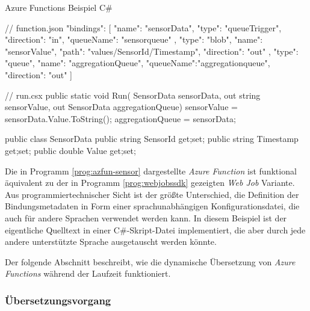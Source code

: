 \begin{program}[!hbt]
\caption{Azure Functions Beispiel C\#}
\label{prog:azfun-sensor}
\noindent\begin{minipage}[t]{.49\textwidth}
\lstset{xleftmargin=0.0cm,framexleftmargin=0.0cm}
\begin{CsCode}[numbers=none]
// function.json
{
  "bindings": [
    { "name": "sensorData",
      "type": "queueTrigger",
      "direction": "in",
      "queueName": "sensorqueue" 
		},
    { "type": "blob",
      "name": "sensorValue",
      "path": "values/{SensorId}/{Timestamp}",
      "direction": "out"
    },
    { "type": "queue",
      "name": "aggregationQueue",
      "queueName":"aggregationqueue",
      "direction": "out"
    }
  ]
}
\end{CsCode}
\end{minipage}\hfill
\begin{minipage}[t]{.48\textwidth}
\lstset{showlines=true,xleftmargin=0.0cm,framexleftmargin=0.0cm}
\begin{CsCode}[numbers=none]
// run.csx
public static void Run(
  SensorData sensorData, 
  out string sensorValue, 
  out SensorData aggregationQueue) {
    sensorValue = 
      sensorData.Value.ToString();
    aggregationQueue = sensorData;
}

public class SensorData {
  public string SensorId {get;set;}
  public string Timestamp {get;set;}
  public double Value {get;set;}
}






\end{CsCode} %
\end{minipage}
\end{program}

Die in Programm \ref{prog:azfun-sensor} dargestellte \textit{Azure Function} ist funktional äquivalent zu der in Programm \ref{prog:webjobssdk} gezeigten \textit{Web Job} Variante. Aus programmiertechnischer Sicht ist der größte Unterschied, die Definition der Bindungsmetadaten in Form einer sprachunabhängigen Konfigurationsdatei, die auch für andere Sprachen verwendet werden kann. In diesem Beispiel ist der eigentliche Quelltext in einer C\#-Skript-Datei implementiert, die aber durch jede andere unterstützte Sprache ausgetauscht werden könnte.

Der folgende Abschnitt beschreibt, wie die dynamische Übersetzung von \textit{Azure Functions} während der Laufzeit funktioniert.

\subsubsection{Übersetzungsvorgang}

